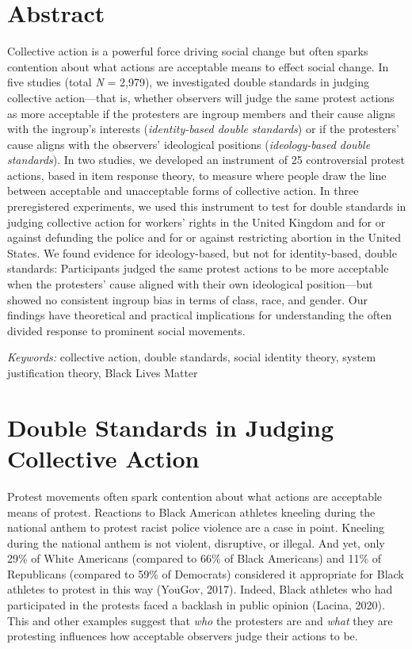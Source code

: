 \documentclass[12pt, letterpaper]{article}
\begin{document}
\section{Abstract}

\noindent Collective action is a powerful force driving social change
but often sparks contention about what actions are acceptable means to
effect social change. In five studies (total \emph{N} = 2,979), we
investigated double standards in judging collective action---that is,
whether observers will judge the same protest actions as more acceptable
if the protesters are ingroup members and their cause aligns with the
ingroup's interests (\emph{identity-based double standards}) or if the
protesters' cause aligns with the observers' ideological positions
(\emph{ideology-based double standards}). In two studies, we developed
an instrument of 25 controversial protest actions, based in item
response theory, to measure where people draw the line between
acceptable and unacceptable forms of collective action. In three
preregistered experiments, we used this instrument to test for double
standards in judging collective action for workers' rights in the United
Kingdom and for or against defunding the police and for or against
restricting abortion in the United States. We found evidence for
ideology-based, but not for identity-based, double standards:
Participants judged the same protest actions to be more acceptable when
the protesters' cause aligned with their own ideological position---but
showed no consistent ingroup bias in terms of class, race, and gender.
Our findings have theoretical and practical implications for
understanding the often divided response to prominent social movements.

\textit{Keywords:} collective action, double standards, social identity
theory, system justification theory, Black Lives Matter

\newpage

\section{ Double Standards in Judging Collective Action }

Protest movements often spark contention about what actions are
acceptable means of protest. Reactions to Black American athletes
kneeling during the national anthem to protest racist police violence
are a case in point. Kneeling during the national anthem is not violent,
disruptive, or illegal. And yet, only 29\% of White Americans (compared
to 66\% of Black Americans) and 11\% of Republicans (compared to 59\% of
Democrats) considered it appropriate for Black athletes to protest in
this way (YouGov, 2017). Indeed, Black athletes who had participated in
the protests faced a backlash in public opinion (Lacina, 2020). This and
other examples suggest that \emph{who} the protesters are and
\emph{what} they are protesting influences how acceptable observers
judge their actions to be.
\end{document}
